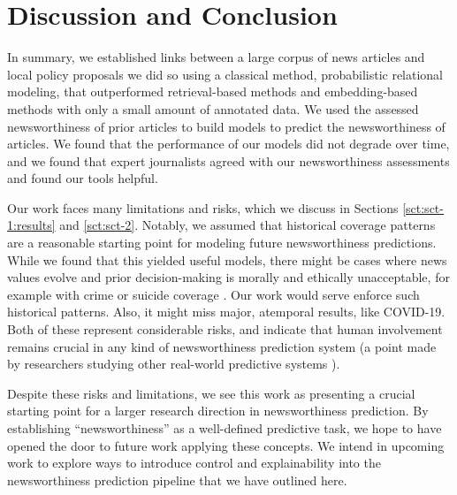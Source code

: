 \documentclass[11pt]{article}
\begin{document}
\section{Discussion and Conclusion}
\label{sct:discussion-and-conclusion}

In summary, we established links between a large corpus of news articles and local policy proposals we did so using a classical method, probabilistic relational modeling, that outperformed retrieval-based methods and embedding-based methods with only a small amount of annotated data. We used the assessed newsworthiness of prior articles to build models to predict the newsworthiness of articles. We found that the performance of our models did not degrade over time, and we found that expert journalists agreed with our newsworthiness assessments and found our tools helpful.

Our work faces many limitations and risks, which we discuss in Sections \ref{sct:sct-1:results} and \ref{sct:sct-2}. Notably, we assumed that historical coverage patterns are a reasonable starting point for modeling future newsworthiness predictions. While we found that this yielded useful models, there might be cases where news values evolve and prior decision-making is morally and ethically unacceptable, for example with crime \cite{oliver2003race} or suicide coverage \cite{niederkrotenthaler2020association}. %
Our work would serve enforce such historical patterns. Also, it might miss major, atemporal results, like COVID-19. Both of these represent considerable risks, and indicate that human involvement remains crucial in any kind of newsworthiness prediction system (a point made by researchers studying other real-world predictive systems \cite{hong2023project}).

Despite these risks and limitations, we see this work as presenting a crucial starting point for a larger research direction in newsworthiness prediction. By establishing ``newsworthiness'' as a well-defined predictive task, we hope to have opened the door to future work applying these concepts. We intend in upcoming work to explore ways to introduce control and explainability into the newsworthiness prediction pipeline that we have outlined here.


\end{document}
